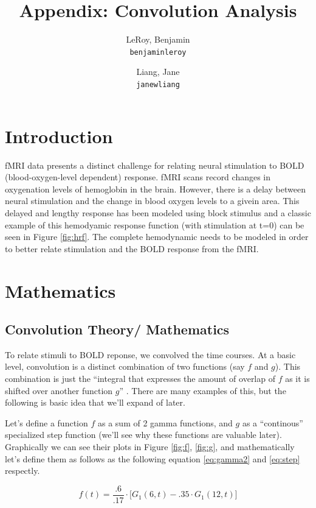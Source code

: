 \documentclass[11pt]{article}
\title{Appendix: Convolution Analysis}
\author{
  LeRoy, Benjamin\\
  \texttt{benjaminleroy}
  \and
  Liang, Jane\\
  \texttt{janewliang}
}
\begin{document}
\maketitle


\section{Introduction}

fMRI data presents a distinct challenge for relating neural stimulation 
to BOLD (blood-oxygen-level dependent) response. fMRI scans record changes 
in oxygenation levels of hemoglobin in the brain. However, there is a delay 
between neural stimulation and the change in blood oxygen levels to a givein 
area. This delayed and lengthy response has been modeled using block stimulus 
and a classic example of this hemodyamic response function (with stimulation 
at t=0) can be seen in Figure \ref{fig:hrf}. The complete hemodynamic needs 
to be modeled in order to better relate  stimulation and the BOLD response 
from the fMRI.

\section{Mathematics}
\subsection{Convolution Theory/ Mathematics}

To relate stimuli to BOLD reponse, we convolved the time courses. At a basic level, convolution is a distinct combination of two functions (say $f$ and $g$). This combination is just the ``integral that expresses the amount of overlap of $f$ as it is shifted over another function
$g$''  \cite{weissten2015convolution}. There are many examples of this, but the following is basic idea that we'll expand of later. 

Let's define a function $f$ as a sum of 2 gamma functions, and $g$ as a ``continous'' specialized step function  (we'll see why these functions are valuable later). Graphically we can see their plots in Figure \ref{fig:f}, \ref{fig:g}, and mathematically let's define them as follows as the following equation \ref{eq:gamma2} and \ref{eq:step} respectly.

\begin{equation} \label{eq:gamma2}
f(t)=\frac{.6}{.17}\cdot  \big[G_1(6,t)-.35 \cdot G_1(12,t) \big]
\end{equation}
\end{document}
